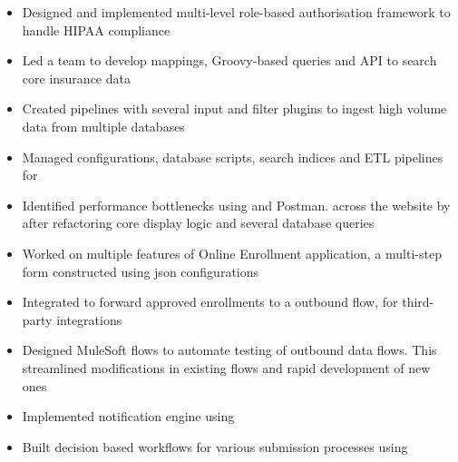 \documentclass[]{resume}
\begin{document}
\begin{minipage}[t]{0.66\textwidth}
\begin{itemize}
    \item Designed and implemented multi-level role-based authorisation framework to handle HIPAA compliance
    \item Led a team to develop  mappings, Groovy-based queries and  API to search core insurance data
    \item Created  pipelines with several input and filter plugins to ingest high volume data from multiple databases
    \item Managed configurations, database scripts, search indices and ETL pipelines for  
    \item Identified performance bottlenecks using  and Postman.  across the website by  after refactoring core display logic and several database queries
    \item Worked on multiple features of Online Enrollment application, a multi-step form constructed using json configurations 
    \item Integrated  to forward approved enrollments to a  outbound flow, for third-party integrations
    \item Designed MuleSoft flows to automate testing of outbound data flows. This streamlined modifications in existing flows and rapid development of new ones
\end{itemize}
\begin{itemize}
    \item Implemented notification engine using 
    \item Built decision based workflows for various submission processes using 
\end{itemize}
\sectionsep





\end{minipage}
\end{document}
